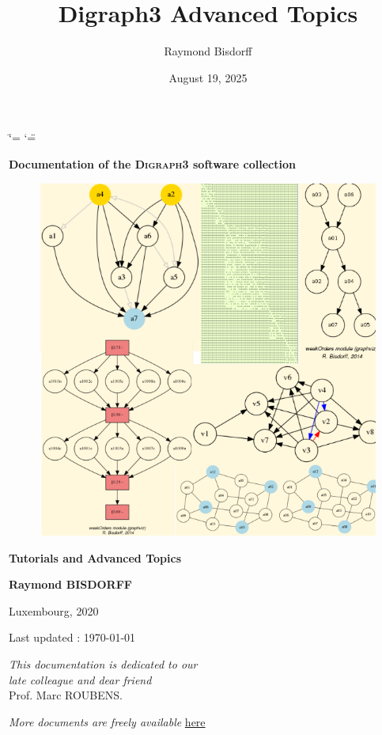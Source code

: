 \documentclass[a4paper,12pt,english]{sphinxhowto}
\title{Digraph3 Advanced Topics}
\date{August 19, 2025}
\author{Raymond Bisdorff}
\begin{document}
\ifdefined\shorthandoff
  \ifnum\catcode`\=\string=\active\shorthandoff{=}\fi
  \ifnum\catcode`\"=\active{}\fi
\fi

\pagestyle{empty}


    \begin{titlepage}
        \centering

        \vspace*{10mm} %
        \textbf{\Large {Documentation of the \textsc{Digraph3} software collection}}

        \vspace{5mm}
        \begin{figure}[!h]
            \centering
            \includegraphics[scale=0.5]{introDoc3.png}
        \end{figure}

        \vspace{10mm}
        \textbf{\Huge {Tutorials and Advanced Topics}}

        \textbf{Raymond BISDORFF}

        \small Luxembourg,  2020

        \small  Last updated : \today
        
        \vspace{10mm}
        \begin{center}
        \emph{This documentation is dedicated to our}\\
        \emph{late colleague and dear friend}\\
         Prof. Marc ROUBENS.
        \end{center}

        \vfill
        \textit{More documents are freely available }{\href{https://digraph3.readthedocs.io/en/latest}{here}}
    \end{titlepage}
\end{document}
